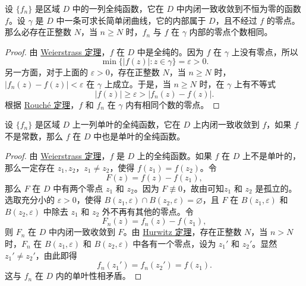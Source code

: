 \documentclass[../../main.tex]{subfiles}%
\begin{document}
\begin{theorem}[Hurwitz定理]\label{theorem:Hurwitz定理}
设 \( \{f_n\} \) 是区域 \( D \) 中的一列全纯函数，它在 \( D \) 中内闭一致收敛到不恒为零的函数 \( f \)。设 \( \gamma \) 是 \( D \) 中一条可求长简单闭曲线，它的内部属于 \( D \)，且不经过 \( f \) 的零点。那么必存在正整数 \( N \)，当 \( n \geqslant  N \) 时，\( f_n \) 与 \( f \) 在 \( \gamma \) 内部的零点个数相同。
\end{theorem}
\begin{proof}

由 \hyperref[theorem:Weierstrass定理]{Weierstrass 定理}，\( f \) 在 \( D \) 中是全纯的。因为 \( f \) 在 \( \gamma \) 上没有零点，所以
\[
\min \{ |f(z)| : z \in \gamma \} = \varepsilon > 0.
\]
另一方面，对于上面的 \( \varepsilon > 0 \)，存在正整数 \( N \)，当 \( n \geqslant  N \) 时，\( |f_n(z) - f(z)| < \varepsilon \) 在 \( \gamma \) 上成立。于是，当 \( n \geqslant  N \) 时，在 \( \gamma \) 上有不等式
\[
|f(z)| \geqslant  \varepsilon > |f_n(z) - f(z)|.
\]
根据 \hyperref[theorem:theorem:Rouché定理-定理4.4.3]{Rouché 定理}，\( f \) 和 \( f_n \) 在 \( \gamma \) 内有相同个数的零点。

\end{proof}

\begin{theorem}\label{theorem:定理4.4.11 }
设 \( \{f_n\} \) 是区域 \( D \) 上一列单叶的全纯函数，它在 \( D \) 上内闭一致收敛到 \( f \)，如果 \( f \) 不是常数，那么 \( f \) 在 \( D \) 中也是单叶的全纯函数。
\end{theorem}
\begin{proof}

由 \hyperref[theorem:Weierstrass定理]{Weierstrass 定理}，\( f \) 是 \( D \) 上的全纯函数。如果 \( f \) 在 \( D \) 上不是单叶的，那么一定存在 \( z_1, z_2 \)，\( z_1 \neq z_2 \)，使得 \( f(z_1) = f(z_2) \)。令
\[
F(z) = f(z) - f(z_1),
\]
那么 \( F \) 在 \( D \) 中有两个零点 \( z_1 \) 和 \( z_2 \)。因为 \( F \not\equiv 0 \)，故由可知\( z_1 \) 和 \( z_2 \) 是孤立的。选取充分小的 \( \varepsilon > 0 \)，使得 \( B(z_1, \varepsilon) \cap B(z_2, \varepsilon) = \varnothing \)，且 \( F \) 在 \( B(z_1, \varepsilon) \) 和 \( B(z_2, \varepsilon) \) 中除去 \( z_1 \) 和 \( z_2 \) 外不再有其他的零点。令
\[
F_n(z) = f_n(z) - f(z_1),
\]
则 \( F_n \) 在 \( D \) 中内闭一致收敛到 \( F \)。由 \hyperref[theorem:Hurwitz定理]{Hurwitz 定理}，存在正整数 \( N \)，当 \( n > N \) 时，\( F_n \) 在 \( B(z_1, \varepsilon) \) 和 \( B(z_2, \varepsilon) \) 中各有一个零点，设为 \( z_1' \) 和 \( z_2' \)。显然 \( z_1' \neq z_2' \)，由此即得
\[
f_n(z_1') = f_n(z_2') = f(z_1).
\]
这与 \( f_n \) 在 \( D \) 内的单叶性相矛盾。 

\end{proof}
\end{document}
